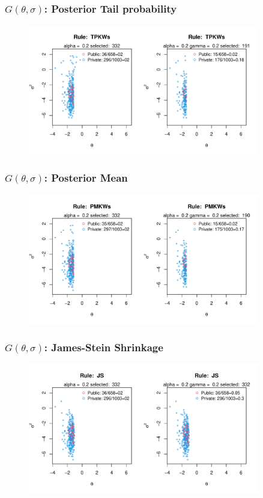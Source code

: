 \documentclass[10pt,mathserif,aspectratio=169]{beamer}
\begin{document}
\begin{frame}
  \frametitle{$G(\theta,\sigma)$: Posterior Tail probability}
  \begin{figure}
    \centering
    \includegraphics[width=0.9\textwidth]{../../Figures/2013-2022/GMM_m/GLVmix/Left_0.2_0.2_TPKWs.pdf}
  \end{figure}
\end{frame}

\begin{frame}
  \frametitle{$G(\theta,\sigma)$: Posterior Mean}
  \begin{figure}
    \centering
    \includegraphics[width=0.9\textwidth]{../../Figures/2013-2022/GMM_m/GLVmix/Left_0.2_0.2_PMKWs.pdf}
  \end{figure}
\end{frame}

\begin{frame}
  \frametitle{$G(\theta,\sigma)$: James-Stein Shrinkage}
  \begin{figure}
    \centering
    \includegraphics[width=0.9\textwidth]{../../Figures/2013-2022/GMM_m/GLVmix/Left_0.2_0.2_JS.pdf}
  \end{figure}
\end{frame}
\end{document}
